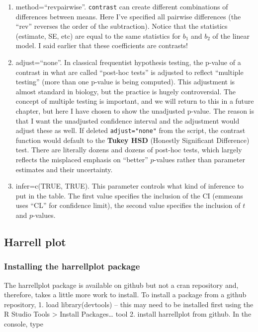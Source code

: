 \documentclass[]{book}
\providecommand{\tightlist}{%
  \setlength{\itemsep}{0pt}\setlength{\parskip}{0pt}}
\begin{document}
\begin{enumerate}
\def\labelenumi{\arabic{enumi}.}
\tightlist
\item
  method=``revpairwise''. \texttt{contrast} can create different combinations of differences between means. Here I've specified all pairwise differences (the ``rev'' reverses the order of the subtraction). Notice that the statistics (estimate, SE, etc) are equal to the same statistics for \(b_1\) and \(b_2\) of the linear model. I said earlier that these coefficients are contrasts!
\item
  adjust=``none''. In classical frequentist hypothesis testing, the p-value of a contrast in what are called ``post-hoc tests'' is adjusted to reflect ``multiple testing'' (more than one p-value is being computed). This adjustment is almost standard in biology, but the practice is hugely controversial. The concept of multiple testing is important, and we will return to this in a future chapter, but here I have chosen to show the unadjusted p-value. The reason is that I want the unadjusted confidence interval and the adjustment would adjust these as well. If deleted \texttt{adjust="none"} from the script, the contrast function would default to the \textbf{Tukey HSD} (Honestly Significant Difference) test. There are literally dozens and dozens of post-hoc tests, which largely reflects the misplaced emphasis on ``better'' \(p\)-values rather than parameter estimates and their uncertainty.
\item
  infer=c(TRUE, TRUE). This parameter controls what kind of inference to put in the table. The first value specifies the inclusion of the CI (emmeans uses ``CL'' for confidence limit), the second value specifies the inclusion of \(t\) and \(p\)-values.
\end{enumerate}

\hypertarget{harrell-plot}{%
\subsection{Harrell plot}\label{harrell-plot}}

\hypertarget{installing-the-harrellplot-package}{%
\subsubsection{Installing the harrellplot package}\label{installing-the-harrellplot-package}}

The harrellplot package is available on github but not a cran repository and, therefore, takes a little more work to install. To install a package from a github repository,
1. load library(devtools) -- this may need to be installed first using the R Studio Tools \textgreater{} Install Packages\ldots{} tool
2. install harrellplot from github. In the console, type
\end{document}
